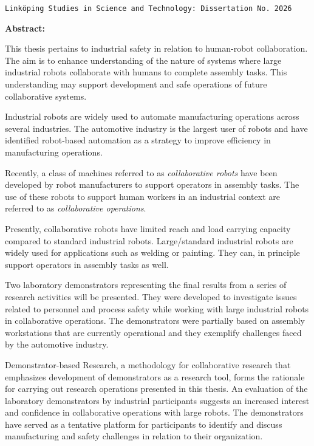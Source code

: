 \thispagestyle{empty}
 \begin{center}

\texttt{Link\"{o}ping Studies in Science and Technology:~Dissertation No.~2026}
  \end{center}
\sloppy

  \begin{small}
\noindent\textbf{Abstract:}
\medskip

\noindent This thesis pertains to industrial safety in relation to human-robot collaboration. 
The aim is to enhance understanding of the nature of systems where large industrial robots collaborate with humans to complete assembly tasks. This understanding may support development and safe operations of future collaborative systems. 

Industrial robots are widely used to automate manufacturing operations across several industries. The automotive industry is the largest user of robots and have identified robot-based automation as a strategy to improve efficiency in manufacturing operations.

Recently, a class of machines referred to as \textit{collaborative robots} have been developed by robot manufacturers to support operators in assembly tasks. The use of these robots to support human workers in an industrial context are referred to as \textit{collaborative operations}.

Presently, collaborative robots have limited reach and load carrying capacity compared to standard industrial robots. 
Large/standard industrial robots are widely used for applications such as welding or painting. They can, in principle support operators in assembly tasks as well. 
 

Two laboratory demonstrators representing the final results from a series of research activities will be presented. They were developed to investigate issues related to personnel and process safety while working with large industrial robots in collaborative operations. The demonstrators were partially based on assembly workstations that are currently operational and they exemplify challenges faced by the automotive industry.

Demonstrator-based Research, a methodology for collaborative research that emphasizes development of demonstrators as a research tool, forms the rationale for carrying out research operations presented in this thesis. 
An evaluation of the laboratory demonstrators by industrial participants suggests an increased interest and confidence in collaborative operations with large robots. The demonstrators have  served as a tentative platform for participants to identify and discuss manufacturing and safety challenges in relation to their organization.


\end{small}
